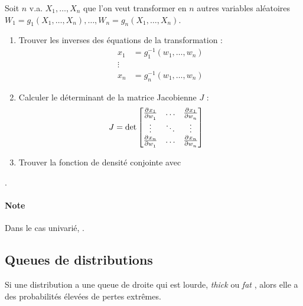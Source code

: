 \documentclass[10pt, french]{article}
\begin{document}
\begin{multicols*}{2}
\begin{algo2}
Soit $n$ v.a. $X_{1}, \dots, X_{n}$ que l'on veut transformer en $n$ autres variables aléatoires $W_{1}	=	g_{1}(X_{1}, \dots, X_{n}), \dots, W_{n}	=	g_{n}(X_{1}, \dots, X_{n})$.
\begin{enumerate}[label	=	\circled{\arabic*}{trueblue}]
	\item	Trouver les inverses des équations de la transformation : 
		\begin{align*}
		x_{1}	
		&=	g^{-1}_{1}(w_{1}, \dots, w_{n})	\\
		\vdots	\\
		x_{n}	
		&=	g^{-1}_{n}(w_{1}, \dots, w_{n})	
		\end{align*}
	\item	Calculer le déterminant de la matrice Jacobienne $J$ : 
		\begin{align*}
		J
		&=	\det \begin{bmatrix}
		\deriv{w_{1}}{x_{1}}	&	\hdots	&	\deriv{w_{n}}{x_{1}}	\\
		\vdots	&	\ddots	&	\vdots	\\
		\deriv{w_{1}}{x_{n}}		&	\hdots	&	\deriv{w_{n}}{x_{n}}
		\end{bmatrix}
		\end{align*}
	\item	Trouver la fonction de densité conjointe avec 
\end{enumerate}
.

\paragraph{Note}	Dans le cas univarié, .
\end{algo2}


\columnbreak
\subsection{Queues de distributions}
\begin{rappel_enhanced}[Contexte]
Si une distribution a une queue de droite qui est lourde, \og \textit{thick} \fg{} ou \og \textit{fat} \fg{}, alors elle a des probabilités élevées de pertes extrêmes.
\end{rappel_enhanced}


\end{multicols*}
\end{document}
